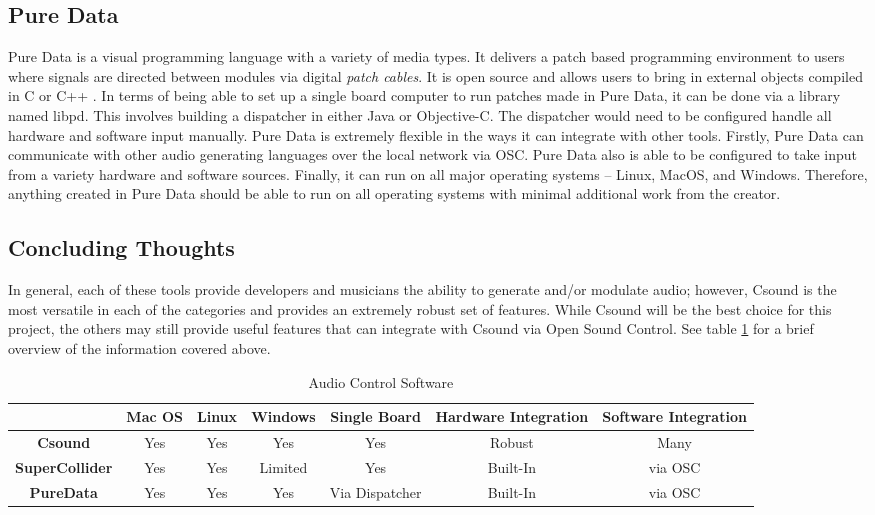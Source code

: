    \subsection{Pure Data}
        Pure Data is a visual programming language with a variety of media types\cite{bib:pd}.
        It delivers a patch based programming environment to users where signals are directed between modules via digital \textit{patch cables}.
        It is open source and allows users to bring in external objects compiled in C or C++ \cite{bib:pd}. 
        In terms of being able to set up a single board computer to run patches made in Pure Data, it can be done via a library named libpd\cite{bib:emPD}.
        This involves building a dispatcher in either Java or Objective-C\cite{bib:emPD}.
        The dispatcher would need to be configured handle all hardware and software input manually.
        Pure Data is extremely flexible in the ways it can integrate with other tools.
        Firstly, Pure Data can communicate with other audio generating languages over the local network via OSC.
        Pure Data also is able to be configured to take input from a variety hardware and software sources.
        Finally, it can run on all major operating systems -- Linux, MacOS, and Windows.
        Therefore, anything created in Pure Data should be able to run on all operating systems with minimal additional work from the creator.
        


    
    \subsection{Concluding Thoughts}
    In general, each of these tools provide developers and musicians the ability to generate and/or modulate audio; however, Csound is the most versatile in each of the categories and provides an extremely robust set of features.
    While Csound will be the best choice for this project, the others may still provide useful features that can integrate with Csound via Open Sound Control.
    See table \ref{tbl:ACS} for a brief overview of the information covered above.
    
        \begin{table}[!ht]
        \begin{center}
        \caption{Audio Control Software}
        \label{tbl:ACS}

            \begin{tabular} {| c | c | c | c | c | c | c |}
            \hline
             & Mac OS & Linux & Windows & Single Board & Hardware Integration & Software Integration \\ \hline
            \textbf{Csound} & Yes & Yes & Yes & Yes & Robust & Many \\ \hline
            \textbf{SuperCollider} & Yes & Yes & Limited & Yes & Built-In & via OSC \\ \hline
            \textbf{PureData} & Yes & Yes & Yes & Via Dispatcher & Built-In & via OSC \\ \hline
            \end{tabular}
            \end{center}
        \end{table}
        
